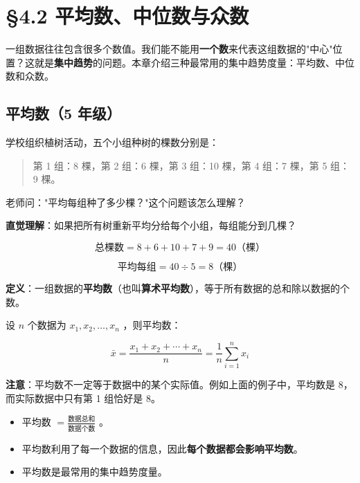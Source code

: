\chapter{§4.2 平均数、中位数与众数}
\label{sec:4.2}





一组数据往往包含很多个数值。我们能不能用\textbf{一个数}来代表这组数据的"中心"位置？这就是\textbf{集中趋势}的问题。本章介绍三种最常用的集中趋势度量：平均数、中位数和众数。



\section*{平均数（5 年级）}


\begin{explore}


学校组织植树活动，五个小组种树的棵数分别是：

\end{explore}

\begin{quote}
第 1 组：8 棵，第 2 组：6 棵，第 3 组：10 棵，第 4 组：7 棵，第 5 组：9 棵。
\end{quote}


老师问："平均每组种了多少棵？"这个问题该怎么理解？

\begin{understand}


\textbf{直觉理解}：如果把所有树重新平均分给每个小组，每组能分到几棵？

\[
\text{总棵数} = 8 + 6 + 10 + 7 + 9 = 40 \text{（棵）}
\]


\[
\text{平均每组} = 40 \div 5 = 8 \text{（棵）}
\]


\textbf{定义}：一组数据的\textbf{平均数}（也叫\textbf{算术平均数}），等于所有数据的总和除以数据的个数。

设 $n$ 个数据为 $x_1, x_2, \ldots, x_n$ ，则平均数：

\[
\bar{x} = \frac{x_1 + x_2 + \cdots + x_n}{n} = \frac{1}{n}\sum_{i=1}^{n} x_i
\]


\textbf{注意}：平均数不一定等于数据中的某个实际值。例如上面的例子中，平均数是 8，而实际数据中只有第 1 组恰好是 8。

\end{understand}

\begin{keytakeaway}


\begin{itemize}
  \item 平均数 $= \frac{\text{数据总和}}{\text{数据个数}}$ 。
  \item 平均数利用了每一个数据的信息，因此\textbf{每个数据都会影响平均数}。
  \item 平均数是最常用的集中趋势度量。
\end{itemize}


\end{keytakeaway}



